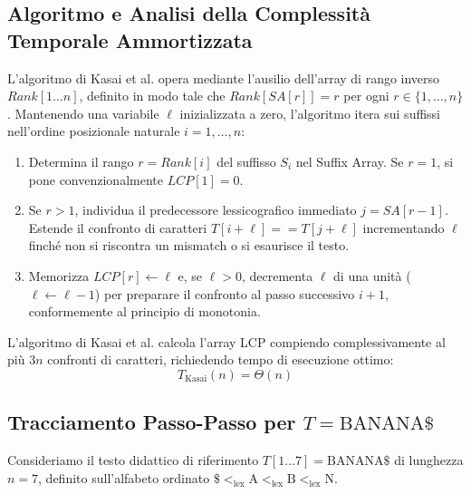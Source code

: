 \FloatBarrier
\subsection{Algoritmo e Analisi della Complessità Temporale Ammortizzata}
\label{subsec:algoritmo-analisi-ammortizzata-kasai}

L'algoritmo di Kasai et al. opera mediante l'ausilio dell'array di rango inverso $Rank[1 \dots n]$, definito in modo tale che $Rank[SA[r]] = r$ per ogni $r \in \{1, \dots, n\}$. Mantenendo una variabile $\ell$ inizializzata a zero, l'algoritmo itera sui suffissi nell'ordine posizionale naturale $i = 1, \dots, n$:
\begin{enumerate}
  \item Determina il rango $r = Rank[i]$ del suffisso $S_i$ nel Suffix Array. Se $r = 1$, si pone convenzionalmente $LCP[1] = 0$.
  \item Se $r > 1$, individua il predecessore lessicografico immediato $j = SA[r - 1]$. Estende il confronto di caratteri $T[i + \ell] == T[j + \ell]$ incrementando $\ell$ finch\'e non si riscontra un mismatch o si esaurisce il testo.
  \item Memorizza $LCP[r] \leftarrow \ell$ e, se $\ell > 0$, decrementa $\ell$ di una unit\`a ($\ell \leftarrow \ell - 1$) per preparare il confronto al passo successivo $i + 1$, conformemente al principio di monotonia.
\end{enumerate}

\begin{theorem}
\label{thm:complessita-lineare-kasai}
L'algoritmo di Kasai et al. calcola l'array LCP compiendo complessivamente al più $3n$ confronti di caratteri, richiedendo tempo di esecuzione ottimo:
\begin{equation}
  T_{\text{Kasai}}(n) = \Theta(n)
\end{equation}
\end{theorem}

\FloatBarrier
\subsection{Tracciamento Passo-Passo per \texorpdfstring{$T = \text{BANANA}\$$}{T = BANANA\$}}
\label{subsec:traccia-banana-kasai}

Consideriamo il testo didattico di riferimento $T[1 \dots 7] = \text{BANANA}\$$ di lunghezza $n = 7$, definito sull'alfabeto ordinato $\$ <_{\text{lex}} \text{A} <_{\text{lex}} \text{B} <_{\text{lex}} \text{N}$. 


